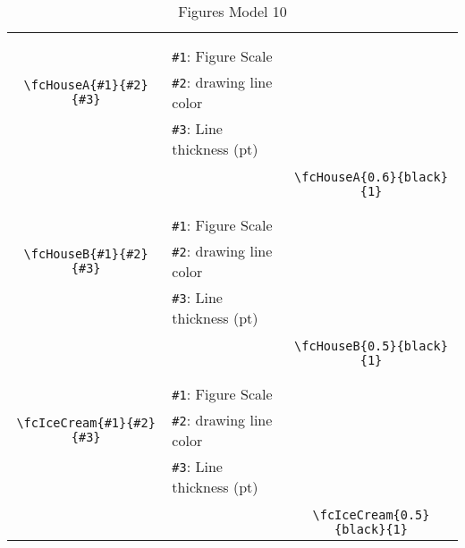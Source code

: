 \documentclass{article}
\begin{document}
\begin{table}[H]
\begin{tabular}{|c|l|c|}
	&&\multirow{5}{*}{\fcHouseA{0.6}{black}{1}}\\	&&\\	&\verb|#1|: Figure Scale &\\	\verb|\fcHouseA{#1}{#2}{#3}|&	\verb|#2|: drawing line color &\\	&\verb|#3|: Line thickness (pt) &\\ &&\\&&	\verb|\fcHouseA{0.6}{black}{1}|\\\hline 	
	&&\multirow{5}{*}{\fcHouseB{0.5}{black}{1}}\\	&&\\	&\verb|#1|: Figure Scale &\\	\verb|\fcHouseB{#1}{#2}{#3}|&	\verb|#2|: drawing line color &\\	&\verb|#3|: Line thickness (pt) &\\ &&\\&&	\verb|\fcHouseB{0.5}{black}{1}|\\\hline 	
	&&\multirow{5}{*}{\fcIceCream{0.5}{black}{1}}\\	&&\\	&\verb|#1|: Figure Scale &\\	\verb|\fcIceCream{#1}{#2}{#3}|&	\verb|#2|: drawing line color &\\	&\verb|#3|: Line thickness (pt) &\\ &&\\&&	\verb|\fcIceCream{0.5}{black}{1}|\\\hline 	\hline\end{tabular}\caption{Figures Model 10}\label{tab10}\end{table}
\end{document}
